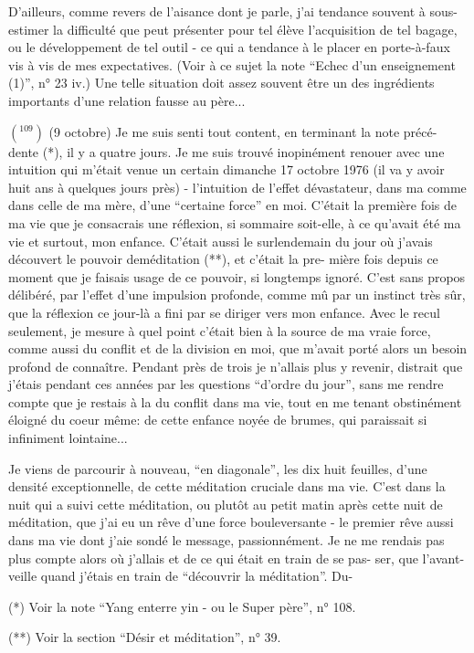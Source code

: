 D'ailleurs, comme revers de l'aisance dont je parle, j'ai tendance souvent
à sous-estimer la difficulté que peut présenter pour tel élève l'acquisition de
tel bagage, ou le développement de tel outil - ce qui a tendance à le placer en
porte-à-faux vis à vis de mes expectatives. (Voir à ce sujet la note ``Echec d'un
enseignement (1)'', n° 23 iv.) Une telle situation doit assez souvent être un des
ingrédients importants d'une relation fausse au père...

\(({}^{109})\) (9 octobre) Je me suis senti tout content, en terminant la note précé-\linebreak
dente (*), il y a quatre jours. Je me suis trouvé inopinément renouer avec une
intuition qui m'était venue un certain dimanche 17 octobre 1976 (il va y avoir
huit ans à quelques jours près) - l'intuition de l'effet dévastateur, dans ma 
comme dans celle de ma mère, d'une ``certaine force'' en moi. C'était la première
fois de ma vie que je consacrais une réflexion, si sommaire soit-elle, à ce
qu'avait été ma vie et surtout, mon enfance. C'était aussi le surlendemain du
jour où j'avais découvert le pouvoir de\quad méditation (**), et c'était la pre-\linebreak
mière fois depuis ce moment que je faisais usage de ce pouvoir, si longtemps
ignoré. C'est sans propos délibéré, par l'effet d'une impulsion profonde, comme
mû par un instinct très sûr, que la réflexion ce jour-là a fini par se diriger
vers mon enfance. Avec le recul seulement, je mesure à quel point c'était bien
à la source de ma vraie force, comme aussi du conflit et de la division en moi,
que m'avait porté alors un besoin profond de connaître. Pendant près de trois 
je n'allais plus y revenir, distrait que j'étais pendant ces années par les 
questions ``d'ordre du jour'', sans me rendre compte que je restais à la 
du conflit dans ma vie, tout en me tenant obstinément éloigné du coeur même: de
cette enfance noyée de brumes, qui paraissait si infiniment lointaine...

Je viens de parcourir à nouveau, ``en diagonale'', les dix huit feuilles,
d'une densité exceptionnelle, de cette méditation cruciale dans ma vie. C'est
dans la nuit qui a suivi cette méditation, ou plutôt au petit matin après cette
nuit de méditation, que j'ai eu un rêve d'une force bouleversante - le premier
rêve aussi dans ma vie dont j'aie sondé le message, passionnément. Je ne me
rendais pas plus compte alors où j'allais et de ce qui était en train de se pas-\linebreak
ser, que l'avant-veille quand j'étais en train de ``découvrir la méditation''. Du-

(*) Voir la note ``Yang enterre yin - ou le Super père'', n° 108.

(**) Voir la section ``Désir et méditation'', n° 39.
